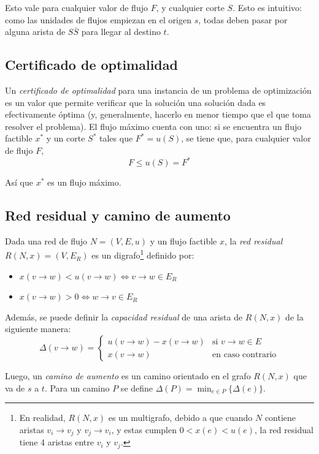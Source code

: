 \documentclass[a4paper]{report}
\newcommand{\si}{\text{si }}
\newcommand{\ecc}{\text{en caso contrario}}
\begin{document}
Esto vale para cualquier valor de flujo $F$, y cualquier corte $S$. Esto es intuitivo: como las unidades de flujos empiezan en el origen $s$, todas deben pasar por alguna arista de $S\bar{S}$ para llegar al destino $t$.

\subsection{Certificado de optimalidad}
\label{flujo-certificado-optimalidad}

Un \textit{certificado de optimalidad} para una instancia de un problema de optimización es un valor que permite verificar que la solución una solución dada es efectivamente óptima (y, generalmente, hacerlo en menor tiempo que el que toma resolver el problema). El flujo máximo cuenta con uno: si se encuentra un flujo factible $x^*$ y un corte $S^*$ tales que $F^* = u(S)$, se tiene que, para cualquier valor de flujo $F$,
    $$F \leq u(S) = F^*$$

Así que $x^*$ es un flujo máximo.

\subsection{Red residual y camino de aumento}

Dada una red de flujo $N = (V, E, u)$ y un flujo factible $x$, la \textit{red residual} $R(N, x) = (V, E_R)$ es un digrafo\footnote{En realidad, $R(N, x)$ es un multigrafo, debido a que cuando $N$ contiene aristas $v_i \rightarrow v_j$ y $v_j \rightarrow v_i$, y estas cumplen $0 < x(e) < u(e)$, la red residual tiene 4 aristas entre $v_i$ y $v_j$.} definido por:
\begin{itemize}
    \item $x(v \rightarrow w) < u(v \rightarrow w) \iff v \rightarrow w \in E_R$
    \item $x(v \rightarrow w) > 0 \iff w \rightarrow v \in E_R$
\end{itemize}

Además, se puede definir la \textit{capacidad residual} de una arista de $R(N, x)$ de la siguiente manera:
$$
\Delta(v \rightarrow w) = 
\begin{cases}
    u(v \rightarrow w) - x(v \rightarrow w) & \si v \rightarrow w \in E \\
    x(v \rightarrow w) & \ecc
\end{cases}
$$

Luego, un \textit{camino de aumento} es un camino orientado en el grafo $R(N, x)$ que va de $s$ a $t$. Para un camino $P$ se define $\Delta(P) = \min_{e \in P}{\{\Delta(e)\}}$.
\end{document}
